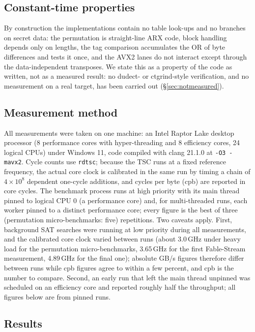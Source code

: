 \documentclass{iacrtrans}
\newcommand{\FableStream}{\textsf{Fable-Stream}\xspace}
\begin{document}
\subsection{Constant-time properties}
\label{sec:ct}
By construction the implementations contain no table look-ups and no branches on secret data: the permutation is straight-line ARX code, block handling depends only on lengths, the tag comparison accumulates the OR of byte differences and tests it once, and the AVX2 lanes do not interact except through the data-independent transposes. We state this as a property of the code as written, not as a measured result: no dudect- or ctgrind-style verification, and no measurement on a real target, has been carried out (\S\ref{sec:notmeasured}).

\subsection{Measurement method}
\label{sec:method}
All measurements were taken on one machine: an Intel Raptor Lake desktop processor (8 performance cores with hyper-threading and 8 efficiency cores, 24 logical CPUs) under Windows 11, code compiled with clang 21.1.0 at \texttt{-O3 -mavx2}. Cycle counts use \texttt{rdtsc}; because the TSC runs at a fixed reference frequency, the actual core clock is calibrated in the same run by timing a chain of $4\times10^8$ dependent one-cycle additions, and cycles per byte (cpb) are reported in core cycles. The benchmark process runs at high priority with its main thread pinned to logical CPU 0 (a performance core) and, for multi-threaded runs, each worker pinned to a distinct performance core; every figure is the best of three (permutation micro-benchmarks: five) repetitions. Two caveats apply. First, background SAT searches were running at low priority during all measurements, and the calibrated core clock varied between runs (about 3.0\,GHz under heavy load for the permutation micro-benchmarks, 3.65\,GHz for the first \FableStream measurement, 4.89\,GHz for the final one); absolute GB/s figures therefore differ between runs while cpb figures agree to within a few percent, and cpb is the number to compare. Second, an early run that left the main thread unpinned was scheduled on an efficiency core and reported roughly half the throughput; all figures below are from pinned runs.

\subsection{Results}
\label{sec:results}
\end{document}
